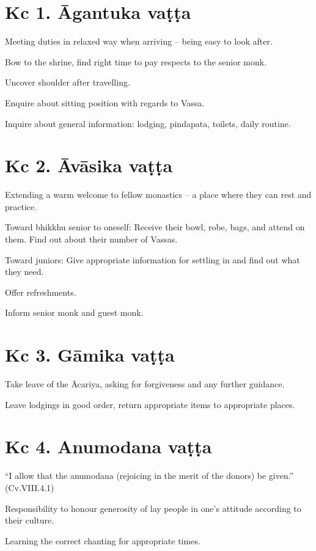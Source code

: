 \section{Kc 1. Āgantuka vaṭṭa}

Meeting duties in relaxed way when arriving -- being easy to look after.

Bow to the shrine, find right time to pay respects to the senior monk.

Uncover shoulder after travelling.

Enquire about sitting position with regards to Vassa.

Inquire about general information: lodging, pindapata, toilets, daily
routine.

\section{Kc 2. Āvāsika vaṭṭa}

Extending a warm welcome to fellow monastics -- a place where they can
rest and practice.

Toward bhikkhu senior to oneself: Receive their bowl, robe, bags, and
attend on them. Find out about their number of Vassas.

Toward juniors: Give appropriate information for settling in and find
out what they need.

Offer refreshments.

Inform senior monk and guest monk.

\section{Kc 3. Gāmika vaṭṭa}

Take leave of the Ācariya, asking for forgiveness and any further
guidance.

Leave lodgings in good order, return appropriate items to appropriate
places.

\section{Kc 4. Anumodana vaṭṭa}

``I allow that the anumodana (rejoicing in the merit of the donors) be
given.'' (Cv.VIII.4.1)

Responsibility to honour generosity of lay people in one's attitude
according to their culture.

Learning the correct chanting for appropriate times.

